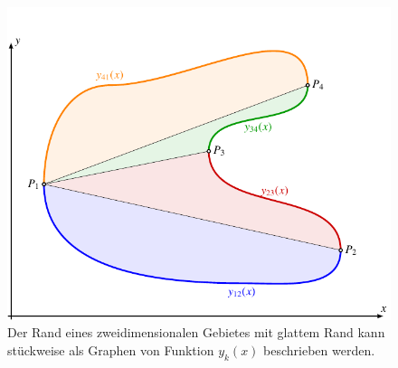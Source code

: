 %
%
%
\begin{figure}
\centering
\includegraphics{chapters/040-felder/images/2drand.pdf}
\caption{Der Rand eines zweidimensionalen Gebietes mit glattem Rand
kann stückweise als Graphen von Funktion $y_k(x)$ beschrieben werden.
\label{buch:felder:fundamentallemma:fig:2drand}}
\end{figure}
